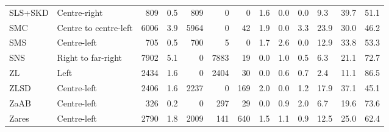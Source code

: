 \begin{tabular}{llrlrrrllllll}
SLS+SKD & Centre-right & 809 & 0.5 & 809 & 0 & 0 & 1.6 & 0.0 & 0.0 & 9.3 & 39.7 & 51.1 \\
SMC & Centre to centre-left & 6006 & 3.9 & 5964 & 0 & 42 & 1.9 & 0.0 & 3.3 & 23.9 & 30.0 & 46.2 \\
SMS & Centre-left & 705 & 0.5 & 700 & 5 & 0 & 1.7 & 2.6 & 0.0 & 12.9 & 33.8 & 53.3 \\
SNS & Right to far-right & 7902 & 5.1 & 0 & 7883 & 19 & 0.0 & 1.0 & 0.5 & 6.3 & 21.1 & 72.7 \\
ZL & Left & 2434 & 1.6 & 0 & 2404 & 30 & 0.0 & 0.6 & 0.7 & 2.4 & 11.1 & 86.5 \\
ZLSD & Centre-left & 2406 & 1.6 & 2237 & 0 & 169 & 2.0 & 0.0 & 1.2 & 17.9 & 37.1 & 45.1 \\
ZaAB & Centre-left & 326 & 0.2 & 0 & 297 & 29 & 0.0 & 0.9 & 2.0 & 6.7 & 19.6 & 73.6 \\
Zares & Centre-left & 2790 & 1.8 & 2009 & 141 & 640 & 1.5 & 1.1 & 0.9 & 12.5 & 25.0 & 62.4 \\
\bottomrule
\end{tabular}
